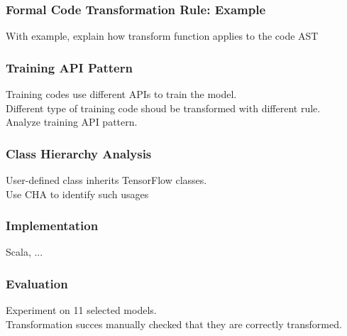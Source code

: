 \documentclass{beamer}
\begin{document}
\begin{frame}
  \frametitle{Formal Code Transformation Rule: Example}
  With example, explain how transform function applies to the code AST
\end{frame}


\begin{frame}
  \frametitle{Training API Pattern}
  Training codes use different APIs to train the model.\\
  Different type of training code shoud be transformed with different rule.\\
  Analyze training API pattern.
\end{frame}


\begin{frame}
  \frametitle{Class Hierarchy Analysis}
  User-defined class inherits TensorFlow classes.\\
  Use CHA to identify such usages
\end{frame}


\begin{frame}
  \frametitle{Implementation}
  Scala, ...
\end{frame}


\begin{frame}
  \frametitle{Evaluation}
  Experiment on 11 selected models.\\
  Transformation succes
  manually checked that they are correctly transformed.\\
\end{frame}
\end{document}

